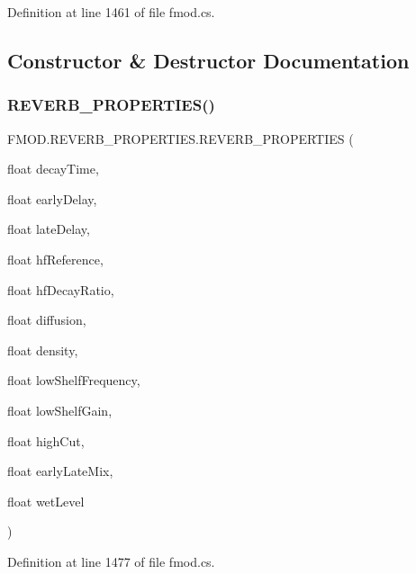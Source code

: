 Definition at line 1461 of file fmod.\+cs.



\subsection{Constructor \& Destructor Documentation}
\mbox{\label{struct_f_m_o_d_1_1_r_e_v_e_r_b___p_r_o_p_e_r_t_i_e_s_a129b0f17b891f390e6ced3e48001c942}} 
\subsubsection{\texorpdfstring{R\+E\+V\+E\+R\+B\+\_\+\+P\+R\+O\+P\+E\+R\+T\+I\+E\+S()}{REVERB\_PROPERTIES()}}
{\footnotesize\ttfamily F\+M\+O\+D.\+R\+E\+V\+E\+R\+B\+\_\+\+P\+R\+O\+P\+E\+R\+T\+I\+E\+S.\+R\+E\+V\+E\+R\+B\+\_\+\+P\+R\+O\+P\+E\+R\+T\+I\+ES (\begin{DoxyParamCaption}\item[{float}]{decay\+Time,  }\item[{float}]{early\+Delay,  }\item[{float}]{late\+Delay,  }\item[{float}]{hf\+Reference,  }\item[{float}]{hf\+Decay\+Ratio,  }\item[{float}]{diffusion,  }\item[{float}]{density,  }\item[{float}]{low\+Shelf\+Frequency,  }\item[{float}]{low\+Shelf\+Gain,  }\item[{float}]{high\+Cut,  }\item[{float}]{early\+Late\+Mix,  }\item[{float}]{wet\+Level }\end{DoxyParamCaption})}



Definition at line 1477 of file fmod.\+cs.



